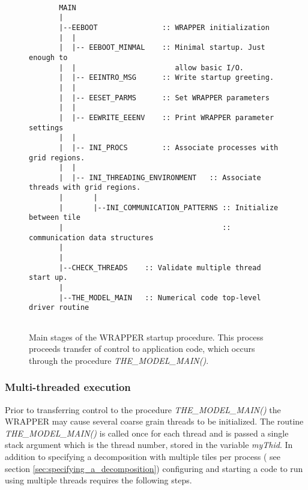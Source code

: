 \begin{figure}
\begin{verbatim}

       MAIN  
       |
       |--EEBOOT               :: WRAPPER initialization
       |  |
       |  |-- EEBOOT_MINMAL    :: Minimal startup. Just enough to
       |  |                       allow basic I/O.
       |  |-- EEINTRO_MSG      :: Write startup greeting.
       |  |
       |  |-- EESET_PARMS      :: Set WRAPPER parameters
       |  |
       |  |-- EEWRITE_EEENV    :: Print WRAPPER parameter settings
       |  |
       |  |-- INI_PROCS        :: Associate processes with grid regions.
       |  |
       |  |-- INI_THREADING_ENVIRONMENT   :: Associate threads with grid regions.
       |       |
       |       |--INI_COMMUNICATION_PATTERNS :: Initialize between tile 
       |                                     :: communication data structures
       |
       |
       |--CHECK_THREADS    :: Validate multiple thread start up.
       |
       |--THE_MODEL_MAIN   :: Numerical code top-level driver routine


\end{verbatim}
\caption{Main stages of the WRAPPER startup procedure.
This process proceeds transfer of control to application code, which
occurs through the procedure {\em THE\_MODEL\_MAIN()}.
} \label{fig:wrapper_startup}
\end{figure}

\subsubsection{Multi-threaded execution}
\label{sec:multi-threaded-execution}
Prior to transferring control to the procedure {\em THE\_MODEL\_MAIN()} the
WRAPPER may cause several coarse grain threads to be initialized. The routine
{\em THE\_MODEL\_MAIN()} is called once for each thread and is passed a single
stack argument which is the thread number, stored in the
variable {\em myThid}. In addition to specifying a decomposition with
multiple tiles per process ( see section \ref{sec:specifying_a_decomposition}) 
configuring and starting a code to run using multiple threads requires the following
steps.\\

